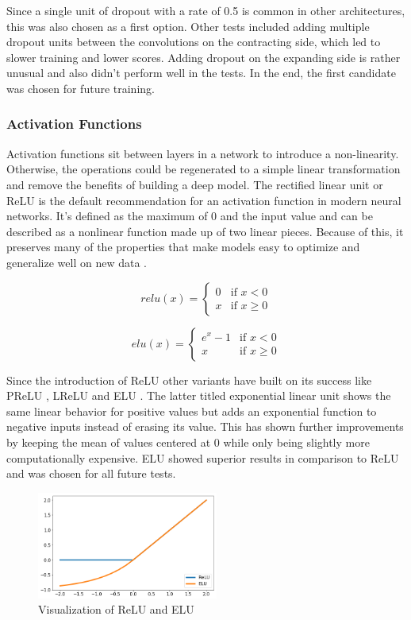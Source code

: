 Since a single unit of dropout with a rate of 0.5 is common in other architectures, this was also chosen as a first option. Other tests included adding multiple dropout units between the convolutions on the contracting side, which led to slower training and lower scores. Adding dropout on the expanding side is rather unusual and also didn't perform well in the tests. In the end, the first candidate was chosen for future training.

\subsubsection{Activation Functions}

Activation functions sit between layers in a network to introduce a non-linearity. Otherwise, the operations could be regenerated to a simple linear transformation and remove the benefits of building a deep model. The rectified linear unit or ReLU \cite{Nair} is the default recommendation for an activation function in modern neural networks. It's defined as the maximum of 0 and the input value and can be described as a nonlinear function made up of two linear pieces. Because of this, it preserves many of the properties that make models easy to optimize and generalize well on new data \cite{Goodfellow2016}.

\[
relu(x) =
\begin{cases} 
0 & \text{if } x < 0  \\
x & \text{if } x \geq 0
\end{cases}
\]

\[
elu(x) =
\begin{cases} 
e^x - 1 & \text{if } x < 0  \\
x & \text{if } x \geq 0
\end{cases}
\]

Since the introduction of ReLU other variants have built on its success like PReLU \cite{He2015a}, LReLU and ELU \cite{Clevert2015}. The latter titled exponential linear unit shows the same linear behavior for positive values but adds an exponential function to negative inputs instead of erasing its value.  This has shown further improvements by keeping the mean of values centered at 0 while only being slightly more computationally expensive. ELU showed superior results in comparison to ReLU and was chosen for all future tests.

\begin{figure}[H]
\centering
\par
\includegraphics[width=0.53\textwidth]{imgs/elu_relu4.png}
\caption{Visualization of ReLU and ELU}
\par
\end{figure}

